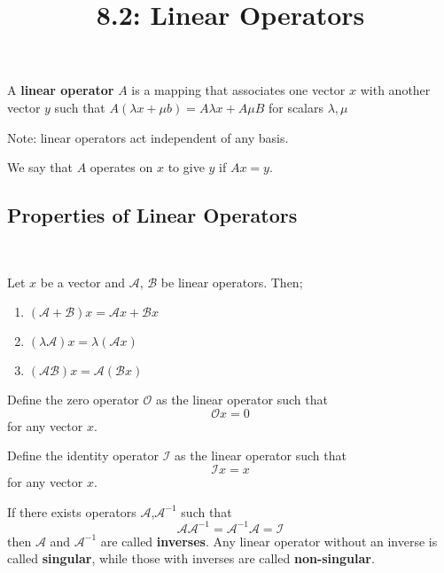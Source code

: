 \documentclass{article}
\title{8.2: Linear Operators}
\begin{document}
\maketitle

\begin{definition}
A \textbf{linear operator} $A$ is a mapping that associates one vector $x$ with another vector $y$ such that $A(\lambda x + \mu b) = A\lambda x + A\mu B$ for scalars $\lambda, \mu$
\end{definition}

Note: linear operators act independent of any basis. 

We say that $A$ operates on $x$ to give $y$ if $Ax = y$.

\subsection{Properties of Linear Operators}
\
\begin{proposition}
Let $x$ be a vector and $\mathcal{A}$, $\mathcal{B}$ be linear operators. Then;
\begin{enumerate}
    \item $(\mathcal{A} + \mathcal{B})x = \mathcal{A}x + \mathcal{B}x$
    \item $(\lambda \mathcal{A})x = \lambda (\mathcal{A} x)$
    \item $(\mathcal{A} \mathcal{B})x = \mathcal{A}(\mathcal{B}x)$
\end{enumerate}
\end{proposition}

\begin{definition}
Define the zero operator $\mathcal{O}$ as the linear operator such that$$\mathcal{O}x = 0$$for any vector $x$.

Define the identity operator $\mathcal{I}$ as the linear operator such that $$\mathcal{I}x = x$$for any vector $x$. 
\end{definition}

\begin{definition}[Inverses]
If there exists operators $\mathcal{A}$,$\mathcal{A ^{-1} }$ such that $$\mathcal{A} \mathcal{A}^{-1} = \mathcal{A}^{-1}\mathcal{A} = \mathcal{I}$$then $\mathcal{A}$ and $\mathcal{A ^{-1} }$ are called \textbf{inverses}. Any linear operator without an inverse is called \textbf{singular}, while those with inverses are called \textbf{non-singular}.       
\end{definition}
\end{document}
